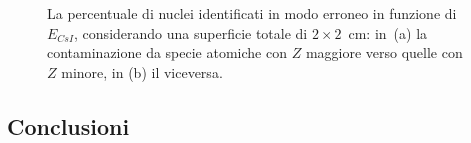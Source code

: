 \begin{figure}[!p] 
	\centering
	\hspace{10mm}
	\caption{La percentuale di nuclei identificati in modo erroneo in funzione di $E_{CsI}$, considerando una superficie totale di $2 \times 2$~cm: in~(a) la contaminazione da specie atomiche con $Z$ maggiore verso quelle con $Z$ minore, in (b) il viceversa.} \label{fig:leakage_res_2}
\end{figure}









\subsection*{Conclusioni}





